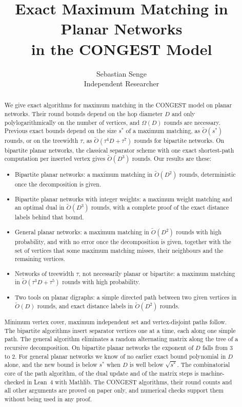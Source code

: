 \documentclass[11pt]{article}
\title{Exact Maximum Matching in Planar Networks\\ in the CONGEST Model}
\author{Sebastian Senge\\ Independent Researcher}
\date{}
\theoremstyle{definition}
\theoremstyle{remark}
\theoremstyle{plain}
\newcommand{\Ot}{\tilde O}
\begin{document}
\maketitle

\begin{abstract}
We give exact algorithms for maximum matching in the CONGEST model on planar networks. Their round
bounds depend on the hop diameter $D$ and only polylogarithmically on the number of vertices, and
$\Omega(D)$ rounds are necessary. Previous exact bounds depend on the size $s^*$ of a maximum matching, as
$\Ot(s^*)$ rounds, or on the treewidth $\tau$, as $\Ot(\tau^4D+\tau^7)$ rounds for bipartite networks. On bipartite planar
networks, the classical separator scheme with one exact shortest-path computation per inserted vertex gives
$\Ot(D^3)$ rounds. Our results are these:
\begin{itemize}[leftmargin=1.5em]
\item Bipartite planar networks: a maximum matching in $\Ot(D^2)$ rounds, deterministic once the decomposition is given.
\item Bipartite planar networks with integer weights: a maximum weight matching and an optimal dual in $\Ot(D^3)$ rounds, with a complete proof of the exact distance labels behind that bound.
\item General planar networks: a maximum matching in $\Ot(D^2)$ rounds with high probability, and with no error once the decomposition is given, together with the set of vertices that some maximum matching misses, their neighbours and the remaining vertices.
\item Networks of treewidth $\tau$, not necessarily planar or bipartite: a maximum matching in $\Ot(\tau^3D+\tau^5)$ rounds with high probability.
\item Two tools on planar digraphs: a simple directed path between two given vertices in $\Ot(D)$ rounds, and exact distance labels in $\Ot(D^2)$ rounds.
\end{itemize}
Minimum vertex cover, maximum independent set and vertex-disjoint paths follow. The bipartite algorithms insert
separator vertices one at a time, each along one simple path. The general algorithm eliminates a random
alternating matrix along the tree of a recursive decomposition. On bipartite planar networks the exponent of $D$ falls from $3$ to $2$. For general planar networks we know of no
earlier exact bound polynomial in $D$ alone, and the new bound is below $s^*$ when $D$ is well below $\sqrt{s^*}$. The combinatorial core of
the path algorithm, of the dual update and of the matrix steps is machine-checked in Lean~4 with Mathlib. The
CONGEST algorithms, their round counts and all other arguments are proved on paper only, and numerical
checks support them without being used in any proof.
\end{abstract}
\end{document}

